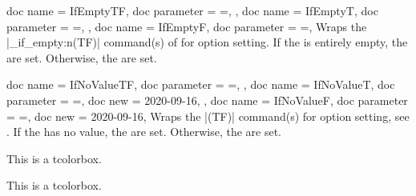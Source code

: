 \begin{docTcbKeys}[doc description = {no default}, doc new = 2022-05-25 ]
  {
    {
      doc name        = IfEmptyTF,
      doc parameter   = {=},
    },
    {
      doc name        = IfEmptyT,
      doc parameter   = {=},
    },
    {
      doc name        = IfEmptyF,
      doc parameter   = {=},
    }
  }
  Wraps the |\tl_if_empty:n(TF)| command(s) of  for option setting.
  If the  is entirely empty, the  are set.
  Otherwise, the  are set.
\end{docTcbKeys}


\clearpage

\begin{docTcbKeys}[doc description = {no default}]
  {
    {
      doc name        = IfNoValueTF,
      doc parameter   = {=},
    },
    {
      doc name        = IfNoValueT,
      doc parameter   = {=},
      doc new         = 2020-09-16,
    },
    {
      doc name        = IfNoValueF,
      doc parameter   = {=},
      doc new         = 2020-09-16,
    }
  }
  Wraps the |\IfNoValue(TF)| command(s) for option setting, see \cite{latexproject:usrguide}.
  If the  has no value, the  are set.
  Otherwise, the  are set.
\begin{dispExample}

\begin{mybox}
This is a tcolorbox.
\end{mybox}

\begin{mybox}
This is a tcolorbox.
\end{mybox}
\end{dispExample}
\end{docTcbKeys}


